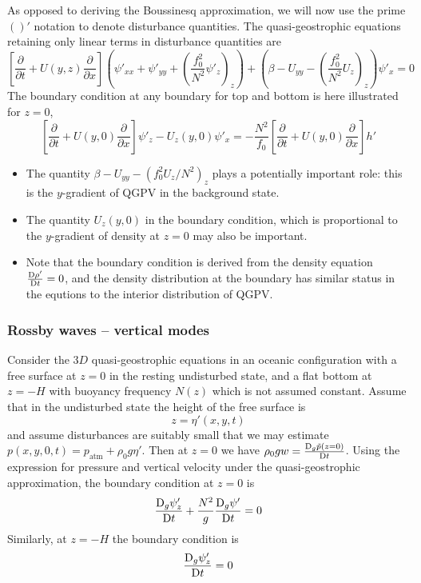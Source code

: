 \documentclass{jknotes}
\begin{document}
As opposed to deriving the Boussinesq approximation, we will now use the prime
$()'$ notation to denote disturbance quantities. The quasi-geostrophic
equations retaining only linear terms in disturbance quantities are
\begin{equation}
	\left[ \frac{\partial}{\partial t} + U(y,z) \frac{\partial}{\partial
	x}\right](\psi'_{xx} + \psi'_{yy} + (\frac{f_0^2}{N^2} \psi'_z)_z) +
	(\beta - U_{yy} - (\frac{f_0^2}{N^2} U_z)_z)\psi'_x = 0 \label{eq:QGPVlin}
\end{equation}
The boundary condition at any boundary for top and bottom is here  illustrated
for $z=0$,
\begin{equation}
	\left[\frac{\partial}{\partial t} + U(y,0) \frac{\partial}{\partial
		x}\right] \psi'_z - U_z(y,0) \psi'_x = -\frac{N^2}{f_0} \left[
			\frac{\partial}{\partial t} + U(y,0) \frac{\partial}{\partial x}
		\right] h'
\end{equation}

\begin{itemize}
	\item The quantity $\beta - U_{yy} - (f_0^2 U_z / N^2)_z$ plays a
		potentially important role: this is the $y$-gradient of QGPV in the
		background state.
	\item The quantity $U_z(y,0)$ in the boundary condition, which is
		proportional to the $y$-gradient of density at $z=0$ may also be
		important.
	\item Note that the boundary condition is derived from the density
		equation $\frac{\mathrm{D} \rho'}{\mathrm{D} t} = 0$, and the density
		distribution at the boundary has similar status in the equtions to the
		interior distribution of QGPV.
\end{itemize}

\subsubsection{Rossby waves -- vertical modes}
Consider the $3D$ quasi-geostrophic equations in an oceanic configuration with
a free surface at $z=0$ in the resting undisturbed state, and a flat bottom at
$z = -H$ with buoyancy frequency $N(z)$ which is not assumed constant. Assume
that in the undisturbed state the height of the free surface is
\begin{equation}
	z = \eta'(x,y,t)
\end{equation}
and assume disturbances are suitably small that we may estimate $p(x,y,0,t) =
p_{\text{atm}} + \rho_0 g \eta'$. Then at $z=0$ we have $\rho_0 g w =
\frac{\mathrm{D}_g \tilde{p}(z=0)}{\mathrm{D} t}$. Using the expression for pressure
and vertical velocity under the quasi-geostrophic approximation, the boundary
condition at $z=0$ is
\begin{equation}
	\frac{\mathrm{D}_g \psi'_z}{\mathrm{D} t} + \frac{N^2}{g} \frac{\mathrm{D}_g
	\psi'}{\mathrm{D} t} = 0
\end{equation}
Similarly, at $z=-H$ the boundary condition is
\begin{equation}
	\frac{\mathrm{D}_g \psi'_z}{\mathrm{D} t} = 0 
\end{equation}
\end{document}
